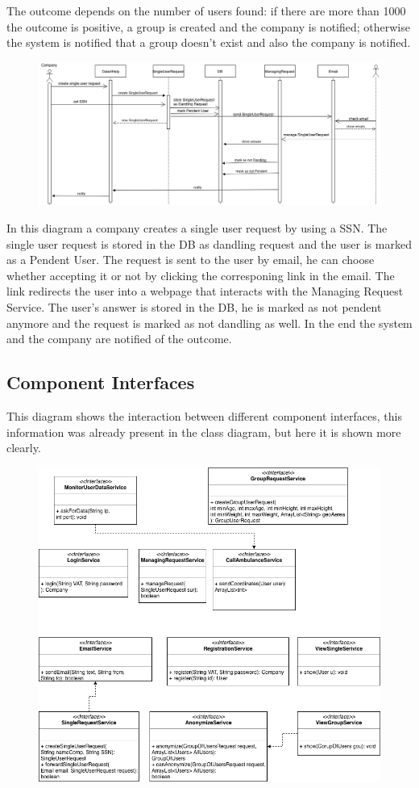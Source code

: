 \documentclass{article}
\begin{document}
The outcome depends on the number of users found: if there are more than 1000 the outcome is positive, a group is created and the company is notified; otherwise the system is notified that a group doesn't exist and also the company is notified.
\newpage
\begin{figure}[h!]
\centering
    \textbf{}\par\medskip
	\includegraphics[width= \linewidth]{singlerequest.png}
\end{figure}
In this diagram a company creates a single user request by using a SSN.  The single user request is stored in the DB as dandling request and the user is marked as a Pendent User. The request is sent to the user by email, he can choose whether accepting it or not by clicking the corresponing link in the email. The link redirects the user into a webpage that interacts with the Managing Request Service. The user's answer is stored in the DB, he is marked as not pendent anymore and the request is marked as not dandling as well. In the end the system and the company are notified of the outcome.
\newpage
\subsection{Component Interfaces}
This diagram shows the interaction between different component interfaces, this information was already present in the class diagram, but here it is shown more clearly.
\begin{figure}[h!]
\centering
    \textbf{}\par\medskip
	\includegraphics[width= \linewidth]{inter.png}
\end{figure}
\newpage
\end{document}
